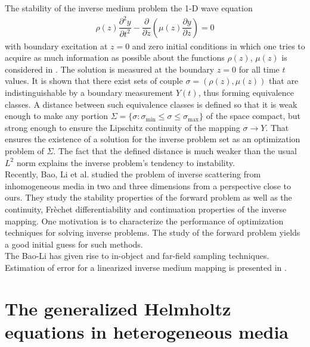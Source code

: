 \documentclass[12pt,twoside]{report}
\begin{document}
The stability of the inverse medium problem the 1-D wave equation 
\begin{align*}
\rho(z) \dfrac{\partial ^2 y}{\partial t^2}-\dfrac{\partial}{\partial z}\left( \mu(z) \dfrac{\partial y}{\partial z}\right) = 0
\end{align*}
with boundary excitation at $z=0$ and zero initial conditions in which one tries to acquire as much information as possible about the functions $\rho(z)$, $\mu(z)$ is considered in \cite{Bamberger1979}. The solution is measured at the boundary $z=0$ for all time $t$ values. It is shown that there exist sets of couple $\sigma = (\rho(z), \mu(z))$ that are indistinguishable by a boundary measurement $Y(t)$, thus forming equivalence classes. A distance between such equivalence classes is defined so that it is weak enough to make any portion $\Sigma =\{ \sigma: \sigma_{\min} \leq \sigma \leq \sigma_{\max}\}$ of the space compact, but strong enough to ensure the Lipschitz continuity of the mapping $\sigma \rightarrow Y$. That ensures the existence of a solution for the inverse problem set as an optimization problem of $\Sigma$. The fact that the defined distance is much weaker than the usual $L^2$ norm explains the inverse problem's tendency to instability. \\

Recently, Bao, Li et al. \cite{BaoLi2005} studied the problem of inverse scattering from inhomogeneous media in two and three dimensions from a perspective close to ours. They study the stability properties of the forward problem as well as the continuity, Fr\`echet differentiability and continuation properties of the inverse mapping. One motivation \cite{BaoHouLi2007} is to characterize the performance of optimization techniques for solving inverse problems. The study of the forward problem yields a good initial guess for such methods. \\
The Bao-Li has given rise to in-object \cite{ItoJinZou2012} and far-field \cite{LiZou2012} sampling techniques. Estimation of error for a linearized inverse medium mapping is presented in \cite{Bao2010}.

\chapter{The generalized Helmholtz equations in heterogeneous media}
\end{document}
